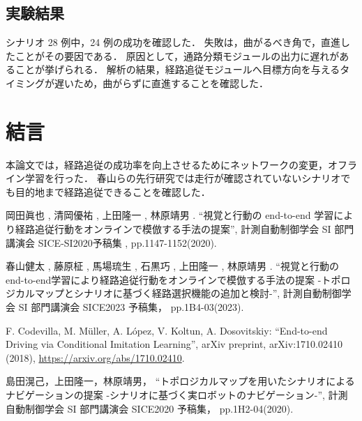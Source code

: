 \documentclass[10pt]{jarticle}
\begin{document}
    \subsection{実験結果}
    シナリオ 28 例中，24 例の成功を確認した．
    失敗は，曲がるべき角で，直進したことがその要因である．
    原因として，通路分類モジュールの出力に遅れがあることが挙げられる．
    解析の結果，経路追従モジュールへ目標方向を与えるタイミングが遅いため，曲がらずに直進することを確認した．

    \section{結\hspace{2zw}言}%
    本論文では，経路追従の成功率を向上させるためにネットワークの変更，オフライン学習を行った．
    春山らの先行研究では走行が確認されていないシナリオでも目的地まで経路追従できることを確認した．


    \vspace{5truemm}
    {\footnotesize
        \begin{thebibliography}{99}
            
            岡田眞也 , 清岡優祐 , 上田隆一 , 林原靖男 .
            ``視覚と行動の end-to-end 学習により経路追従行動をオンラインで模倣する手法の提案'',
            計測自動制御学会 SI 部門講演会 SICE-SI2020予稿集 , 
            pp.1147-1152(2020).

            春山健太 , 藤原柾 , 馬場琉生 , 石黒巧 , 上田隆一 , 林原靖男 .
            ``視覚と行動のend-to-end学習により経路追従行動をオンラインで模倣する手法の提案 -トポロジカルマップとシナリオに基づく経路選択機能の追加と検討-'',
            計測自動制御学会 SI 部門講演会 SICE2023 予稿集，
            pp.1B4-03(2023).
       
            F. Codevilla, M. Müller, A. López, V. Koltun, A. Dosovitskiy: 
            ``End-to-end Driving via Conditional Imitation Learning'', 
            arXiv preprint, arXiv:1710.02410 (2018), 
            \url{https://arxiv.org/abs/1710.02410}.

            島田滉己，上田隆一，林原靖男，
            ``トポロジカルマップを用いたシナリオによるナビゲーションの提案 -シナリオに基づく実ロボットのナビゲーション-'',
            計測自動制御学会 SI 部門講演会 SICE2020 予稿集，
            pp.1H2-04(2020).



        \end{thebibliography}
    }
    \normalsize
    
\end{document}
